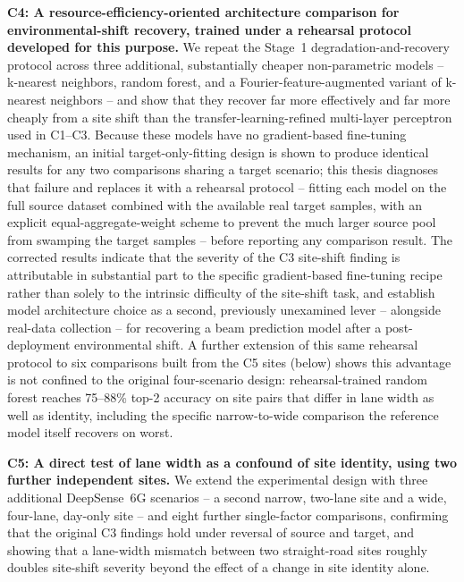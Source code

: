 \documentclass{iutbscthesis}
\begin{document}
\textbf{C4: A resource-efficiency-oriented architecture comparison for environmental-shift recovery, trained under a rehearsal protocol developed for this purpose.} We repeat the Stage~1 degradation-and-recovery protocol across three additional, substantially cheaper non-parametric models -- k-nearest neighbors, random forest, and a Fourier-feature-augmented variant of k-nearest neighbors -- and show that they recover far more effectively and far more cheaply from a site shift than the transfer-learning-refined multi-layer perceptron used in C1--C3. Because these models have no gradient-based fine-tuning mechanism, an initial target-only-fitting design is shown to produce identical results for any two comparisons sharing a target scenario; this thesis diagnoses that failure and replaces it with a rehearsal protocol -- fitting each model on the full source dataset combined with the available real target samples, with an explicit equal-aggregate-weight scheme to prevent the much larger source pool from swamping the target samples -- before reporting any comparison result. The corrected results indicate that the severity of the C3 site-shift finding is attributable in substantial part to the specific gradient-based fine-tuning recipe rather than solely to the intrinsic difficulty of the site-shift task, and establish model architecture choice as a second, previously unexamined lever -- alongside real-data collection -- for recovering a beam prediction model after a post-deployment environmental shift. A further extension of this same rehearsal protocol to six comparisons built from the C5 sites (below) shows this advantage is not confined to the original four-scenario design: rehearsal-trained random forest reaches 75--88\% top-2 accuracy on site pairs that differ in lane width as well as identity, including the specific narrow-to-wide comparison the reference model itself recovers on worst.

\textbf{C5: A direct test of lane width as a confound of site identity, using two further independent sites.} We extend the experimental design with three additional DeepSense~6G scenarios -- a second narrow, two-lane site and a wide, four-lane, day-only site -- and eight further single-factor comparisons, confirming that the original C3 findings hold under reversal of source and target, and showing that a lane-width mismatch between two straight-road sites roughly doubles site-shift severity beyond the effect of a change in site identity alone.
\end{document}
